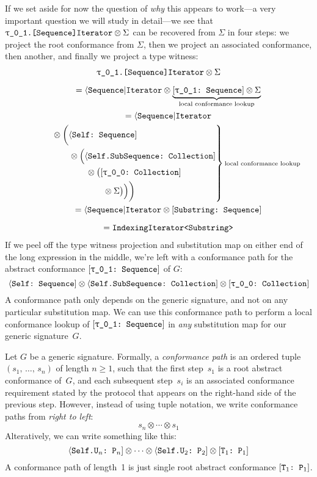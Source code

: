 \documentclass[../generics]{subfiles}
\begin{document}
\begin{example}
If we set aside for now the question of \emph{why} this appears to work---a very important question we will study in detail---we see that $\texttt{\rU.[Sequence]Iterator}\otimes\Sigma$ can be recovered from $\Sigma$ in four steps: we project the root conformance from $\Sigma$, then we project an associated conformance, then another, and finally we project a type witness:
\begin{gather*}
\texttt{\rU.[Sequence]Iterator} \otimes \Sigma\\[\medskipamount]
\qquad {} = \AIterator \otimes \underbrace{\rUSequence \otimes \Sigma}_{\text{\scriptsize local conformance lookup}}\\
\qquad {} = \AIterator\\
\qquad \qquad \begin{rcases*}
{} \otimes \biggl(\SelfSequence\\
\qquad {} \otimes \Bigl(\SelfSubSequence\\
\qquad \qquad {} \otimes \bigl(\rTCollection\\
\qquad \qquad \qquad {} \otimes \Sigma\bigr)\Bigr)\biggr)
\end{rcases*}\text{\scriptsize local conformance lookup}\\
\qquad {} = \AIterator \otimes \SubstringSequence\\[\medskipamount]
\qquad {} = \texttt{IndexingIterator<Substring>}
\end{gather*}
%
If we peel off the type witness projection and substitution map on either end of the long expression in the middle, we're left with a conformance path for the abstract conformance $\rUSequence$ of $G$:
\[\SelfSequence \otimes \SelfSubSequence \otimes \rTCollection\]
A conformance path only depends on the generic signature, and not on any particular substitution map. We can use this conformance path to perform a local conformance lookup of $\rUSequence$ in \emph{any} substitution map for our generic signature~$G$.
\end{example}

\begin{definition}\label{conformance path def}
Let $G$ be a generic signature. Formally, a \emph{conformance path} is an ordered tuple $(s_1,\,\ldots,\,s_n)$ of length $n \geq 1$, such that the first step~$s_1$ is a root abstract conformance of~$G$, and each subsequent step~$s_i$ is an associated conformance requirement stated by the protocol that appears on the right-hand side of the previous step. However, instead of using tuple notation, we write conformance paths from \emph{right to left}:
\[s_n\otimes\cdots \otimes s_1\]
Alteratively, we can write something like this:
\[\langle\texttt{Self.$\texttt{U}_n$:~$\texttt{P}_n$}] \otimes \cdots \otimes \langle\texttt{Self.$\texttt{U}_2$:~$\texttt{P}_2$}] \otimes [\texttt{$\texttt{T}_1$:~$\texttt{P}_1$}] \]
A conformance path of length~1 is just single root abstract conformance $[\texttt{$\texttt{T}_1$:~$\texttt{P}_1$}]$.
\end{definition}
\end{document}
